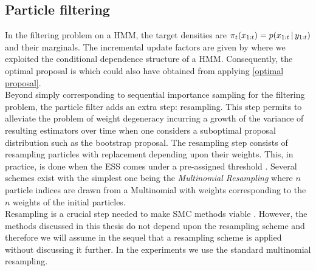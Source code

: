 \subsection{Particle filtering}
In the filtering problem on a HMM, the target densities are $\pi_{t}(x_{1:t})=p(x_{1:t}\,|\, y_{1:t})$ and their marginals. The incremental update factors are given by
where we exploited the conditional dependence structure of a HMM. Consequently, the optimal proposal is
which could also have obtained from applying \eqref{optimal proposal}.\\
Beyond simply corresponding to sequential importance sampling for the filtering problem, the particle filter adds an extra step: resampling. 
This step permits to alleviate the problem of weight degeneracy incurring a growth of the variance of resulting estimators over time when one considers a suboptimal proposal distribution such as the bootstrap proposal. 
The resampling step consists of resampling particles with replacement depending upon their weights.
This, in practice, is done when the ESS comes under a pre-assigned threshold \citep{delmoral06}.
Several schemes exist with the simplest one being the \emph{Multinomial Resampling} where $n$ particle indices are drawn from a Multinomial with weights corresponding to the $n$ weights of the initial particles.\\
Resampling is a crucial step needed to make SMC methods viable \citep{hol06, doucet11}. However, the methods discussed in this thesis do not depend upon the resampling scheme and therefore we will assume in the sequel that a resampling scheme is applied without discussing it further. In the experiments we use the standard multinomial resampling.


